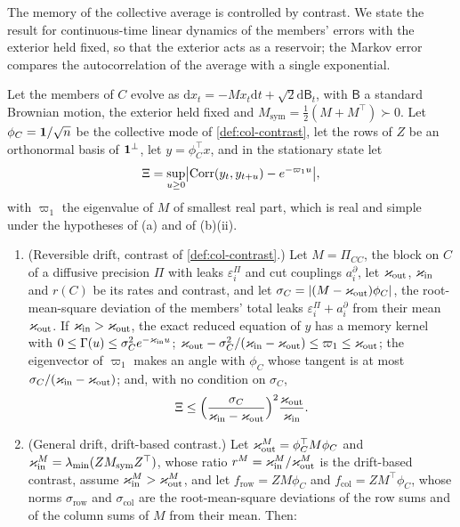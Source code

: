 The memory of the collective average is controlled by contrast. We state the result for continuous-time linear dynamics of the members' errors with the exterior held fixed, so that the exterior acts as a reservoir; the Markov error compares the autocorrelation of the average with a single exponential.

\begin{theorem}\label{thm:agy-closure-average}
Let the members of $C$ evolve as $\mathrm dx_t=-Mx_t\mathrm dt+\sqrt2\mathrm d\mathsf B_t$, with $\mathsf B$ a standard Brownian motion, the exterior held fixed and $M_{\mathrm{sym}}=\frac12(M+M^\top)\succ0$. Let $\phi_C=\mathbf{1}/\sqrt n$ be the collective mode of \cref{def:col-contrast}, let the rows of $Z$ be an orthonormal basis of $\mathbf{1}^\perp$, let $y=\phi_C^\top x$, and in the stationary state let
\begin{equation}\label{eq:agy-markov-error}
\Xi=\sup_{u\ge0}\bigl\lvert\operatorname{Corr}(y_t,y_{t+u})-e^{-\varpi_1u}\bigr\rvert,
\end{equation}
with $\varpi_1$ the eigenvalue of $M$ of smallest real part, which is real and simple under the hypotheses of (a) and of (b)(ii).
\begin{enumerate}
\item[(a)] (Reversible drift, contrast of \cref{def:col-contrast}.) Let $M=\Pi_{CC}$, the block on $C$ of a diffusive precision $\Pi$ with leaks $\varepsilon^\Pi_i$ and cut couplings $a^\partial_i$, let $\varkappa_{\mathrm{out}}$, $\varkappa_{\mathrm{in}}$ and $r(C)$ be its rates and contrast, and let $\sigma_C=\lvert(M-\varkappa_{\mathrm{out}})\phi_C\rvert$, the root-mean-square deviation of the members' total leaks $\varepsilon^\Pi_i+a^\partial_i$ from their mean $\varkappa_{\mathrm{out}}$. If $\varkappa_{\mathrm{in}}>\varkappa_{\mathrm{out}}$, the exact reduced equation of $y$ has a memory kernel with $0\le\Gamma(u)\le\sigma_C^2e^{-\varkappa_{\mathrm{in}} u}$; $\varkappa_{\mathrm{out}}-\sigma_C^2/(\varkappa_{\mathrm{in}}-\varkappa_{\mathrm{out}})\le\varpi_1\le\varkappa_{\mathrm{out}}$; the eigenvector of $\varpi_1$ makes an angle with $\phi_C$ whose tangent is at most $\sigma_C/(\varkappa_{\mathrm{in}}-\varkappa_{\mathrm{out}})$; and, with no condition on $\sigma_C$,
\begin{equation}\label{eq:agy-markov-sym}
\Xi\le\Bigl(\frac{\sigma_C}{\varkappa_{\mathrm{in}}-\varkappa_{\mathrm{out}}}\Bigr)^2\frac{\varkappa_{\mathrm{out}}}{\varkappa_{\mathrm{in}}}.
\end{equation}
\item[(b)] (General drift, drift-based contrast.) Let $\varkappa_{\mathrm{out}}^M=\phi_C^\top M\phi_C$ and $\varkappa_{\mathrm{in}}^M=\lambda_{\min}(ZM_{\mathrm{sym}}Z^\top)$, whose ratio $r^M=\varkappa_{\mathrm{in}}^M/\varkappa_{\mathrm{out}}^M$ is the drift-based contrast, assume $\varkappa_{\mathrm{in}}^M>\varkappa_{\mathrm{out}}^M$, and let $f_{\mathrm{row}}=ZM\phi_C$ and $f_{\mathrm{col}}=ZM^\top\phi_C$, whose norms $\sigma_{\mathrm{row}}$ and $\sigma_{\mathrm{col}}$ are the root-mean-square deviations of the row sums and of the column sums of $M$ from their mean. Then:

\end{enumerate}
\end{theorem}

